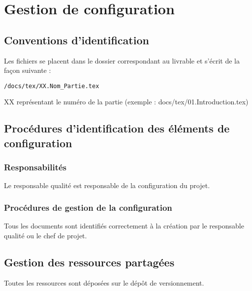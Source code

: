 \section{Gestion de configuration}

\subsection{Conventions d'identification}
Les fichiers se placent dans le dossier correspondant au livrable et s'écrit de la façon suivante : 
\begin{verbatim}/docs/tex/XX.Nom_Partie.tex\end{verbatim}
XX représentant le numéro de la partie (exemple : docs/tex/01.Introduction.tex)

\subsection{Procédures d'identification des éléments de configuration}

\subsubsection{Responsabilités}
Le responsable qualité est responsable de la configuration du projet.

\subsubsection{Procédures de gestion de la configuration}
Tous les documents sont identifiés correctement à la création par le responsable qualité ou le chef de projet.

\subsection{Gestion des ressources partagées}
Toutes les ressources sont déposées sur le dépôt de versionnement.
\vfill
\pagebreak
